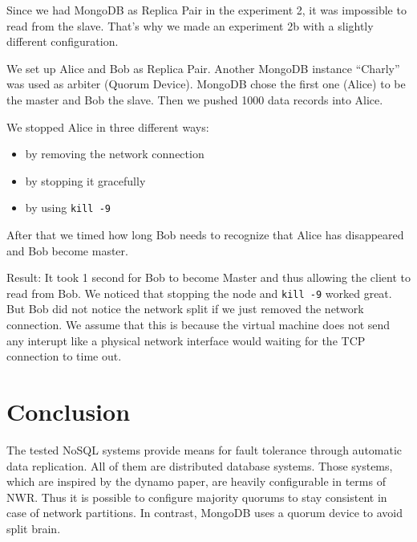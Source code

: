 Since we had MongoDB as Replica Pair in the experiment 2, it was
impossible to read from the slave. That's why we made an experiment
2b with a slightly different configuration.

We set up Alice and Bob as Replica Pair. Another MongoDB instance
``Charly'' was used as arbiter (Quorum Device). MongoDB chose the
first one (Alice) to be the master and Bob the slave. Then we
pushed 1000 data records into Alice.

We stopped Alice in three different ways:

\begin{itemize}
\item
  by removing the network connection
\item
  by stopping it gracefully
\item
  by using \texttt{kill -9}
\end{itemize}
After that we timed how long Bob needs to recognize that Alice has
disappeared and Bob become master.

Result: It took 1 second for Bob to become Master and thus allowing
the client to read from Bob. We noticed that stopping the node and \texttt{kill -9} worked great. But
Bob did not notice the network split if we just removed the network
connection. We assume that this is because the virtual machine does
not send any interupt like a physical network interface would
waiting for the TCP connection to time out.


\section{Conclusion} %
\label{sec:conclusion}

The tested NoSQL systems provide means for fault tolerance through automatic data replication.
All of them are distributed database systems.
Those systems, which are inspired by the dynamo paper, are heavily configurable in terms of NWR.
Thus it is possible to configure majority quorums to stay consistent in case of network partitions.
In contrast, MongoDB uses a quorum device to avoid split brain.




